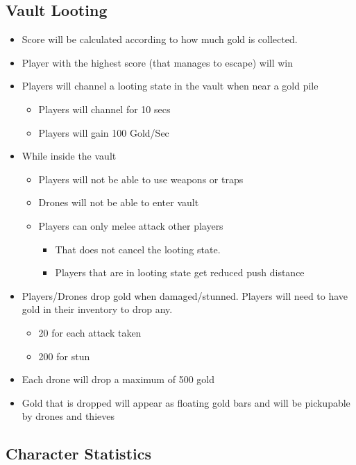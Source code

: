 \documentclass[10pt]{report}
\begin{document}
\subsection{Vault Looting}

\begin{itemize}
    \item Score will be calculated according to how much gold is collected.
    \item Player with the highest score (that manages to escape) will win
    \item Players will channel a looting state in the vault when near a gold pile 
    \begin{itemize}
        \item Players will channel for 10 secs
        \item Players will gain 100 Gold/Sec
    \end{itemize}
    \item While inside the vault
    \begin{itemize}
        \item Players will not be able to use weapons or traps
        \item Drones will not be able to enter vault
        \item Players can only melee attack other players 
        \begin{itemize}
            \item That does not cancel the looting state.
            \item Players that are in looting state get reduced push distance
        \end{itemize}
    \end{itemize}
    \item Players/Drones drop gold when damaged/stunned. Players will need to have gold in their inventory to drop any.
    \begin{itemize}
        \item 20  for each attack taken
        \item 200 for stun
    \end{itemize}
    \item Each drone will drop a maximum of 500 gold
    \item Gold that is dropped will appear as floating gold bars and will be pickupable by drones and thieves     
\end{itemize}

\subsection{Character Statistics}
\end{document}
